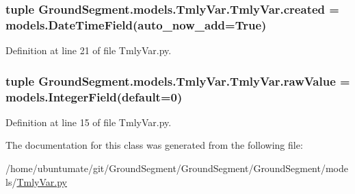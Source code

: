 \subsubsection[{created}]{\setlength{\rightskip}{0pt plus 5cm}tuple Ground\+Segment.\+models.\+Tmly\+Var.\+Tmly\+Var.\+created = models.\+Date\+Time\+Field(auto\+\_\+now\+\_\+add=True)\hspace{0.3cm}{\ttfamily [static]}}\label{class_ground_segment_1_1models_1_1_tmly_var_1_1_tmly_var_acc0d1d6a558e6194dfd4fbd375df6f67}


Definition at line 21 of file Tmly\+Var.\+py.

\hypertarget{class_ground_segment_1_1models_1_1_tmly_var_1_1_tmly_var_a1977b5e57c94d403dc4d6c624068ef59}{}
\subsubsection[{raw\+Value}]{\setlength{\rightskip}{0pt plus 5cm}tuple Ground\+Segment.\+models.\+Tmly\+Var.\+Tmly\+Var.\+raw\+Value = models.\+Integer\+Field(default=0)\hspace{0.3cm}{\ttfamily [static]}}\label{class_ground_segment_1_1models_1_1_tmly_var_1_1_tmly_var_a1977b5e57c94d403dc4d6c624068ef59}


Definition at line 15 of file Tmly\+Var.\+py.



The documentation for this class was generated from the following file\+:\begin{DoxyCompactItemize}
\item 
/home/ubuntumate/git/\+Ground\+Segment/\+Ground\+Segment/\+Ground\+Segment/models/\hyperlink{_tmly_var_8py}{Tmly\+Var.\+py}\end{DoxyCompactItemize}
